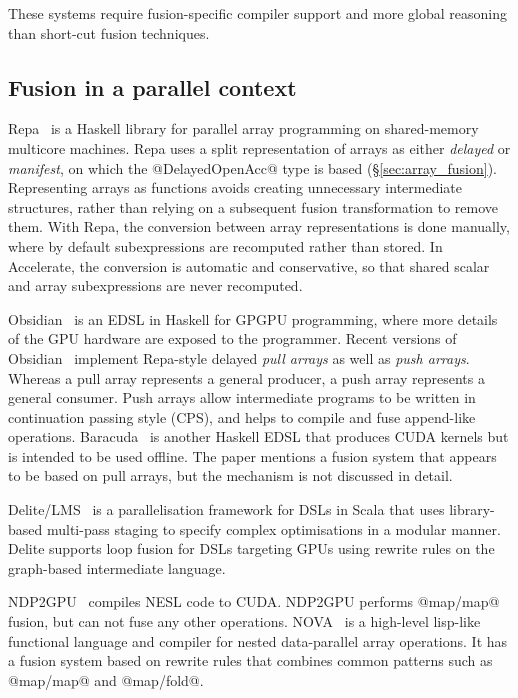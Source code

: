 These systems require fusion-specific compiler support and more global reasoning
than short-cut fusion techniques.


\subsection{Fusion in a parallel context}

Repa~\cite{Keller:2010er} is a Haskell library for parallel array programming on
shared-memory multicore machines. Repa uses a split
representation of arrays as either \emph{delayed} or \emph{manifest}, on which
the @DelayedOpenAcc@ type is based (\S\ref{sec:array_fusion}). Representing
arrays as functions avoids creating unnecessary intermediate structures, rather
than relying on a subsequent fusion transformation to remove them. With Repa,
the conversion between array representations is done manually, where by default
subexpressions are recomputed rather than stored. In Accelerate, the conversion
is automatic and conservative, so that shared scalar and array subexpressions
are never recomputed.

Obsidian~\cite{Svensson:2008a} is an EDSL in Haskell for GPGPU programming,
where more details of the GPU hardware are exposed to the programmer. Recent
versions of Obsidian~\cite{Claessen:2012hl} implement Repa-style delayed
\emph{pull arrays} as well as \emph{push
arrays}. Whereas a pull array represents a general
producer, a push array represents a general consumer. Push arrays allow
intermediate programs to be written in continuation passing style
(CPS), and helps to compile and fuse append-like operations.
Baracuda~\cite{Larsen:2011fa} is another Haskell EDSL that produces CUDA kernels
but is intended to be used offline. The paper mentions a fusion system that
appears to be based on pull arrays, but the mechanism is not discussed in
detail.

Delite/LMS~\cite{Rompf:2013er} is a parallelisation framework for DSLs in Scala
that uses library-based multi-pass staging to specify complex optimisations in a
modular manner. Delite supports loop fusion for DSLs targeting GPUs using
rewrite rules on the graph-based intermediate language.

NDP2GPU~\cite{Bergstrom:2012bi} compiles NESL code to CUDA. NDP2GPU performs
@map/map@ fusion, but can not fuse any other operations.
NOVA~\cite{Collins:2013wn} is a high-level lisp-like functional language and
compiler for nested data-parallel array operations. It has a fusion system based
on rewrite rules that combines common patterns such as @map/map@ and @map/fold@.

